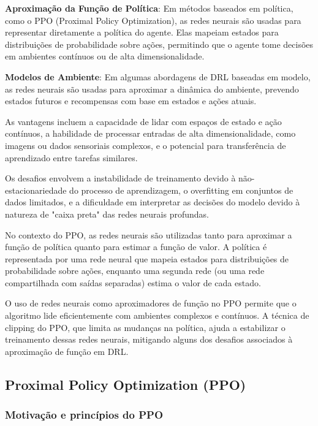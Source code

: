 \textbf{Aproximação da Função de Política}: Em métodos baseados em política, como o PPO (Proximal Policy Optimization), as redes neurais são usadas para representar diretamente a política do agente. Elas mapeiam estados para distribuições de probabilidade sobre ações, permitindo que o agente tome decisões em ambientes contínuos ou de alta dimensionalidade.

\textbf{Modelos de Ambiente}: Em algumas abordagens de DRL baseadas em modelo, as redes neurais são usadas para aproximar a dinâmica do ambiente, prevendo estados futuros e recompensas com base em estados e ações atuais.


As vantagens incluem a capacidade de lidar com espaços de estado e ação contínuos, a habilidade de processar entradas de alta dimensionalidade, como imagens ou dados sensoriais complexos, e o potencial para transferência de aprendizado entre tarefas similares. 

Os desafios envolvem a instabilidade de treinamento devido à não-estacionariedade do processo de aprendizagem, o overfitting em conjuntos de dados limitados, e a dificuldade em interpretar as decisões do modelo devido à natureza de "caixa preta" das redes neurais profundas.


No contexto do PPO, as redes neurais são utilizadas tanto para aproximar a função de política quanto para estimar a função de valor. A política é representada por uma rede neural que mapeia estados para distribuições de probabilidade sobre ações, enquanto uma segunda rede (ou uma rede compartilhada com saídas separadas) estima o valor de cada estado.

O uso de redes neurais como aproximadores de função no PPO permite que o algoritmo lide eficientemente com ambientes complexos e contínuos. A técnica de clipping do PPO, que limita as mudanças na política, ajuda a estabilizar o treinamento dessas redes neurais, mitigando alguns dos desafios associados à aproximação de função em DRL.


\subsection{Proximal Policy Optimization (PPO)}
\label{subsec:ppo}

\subsubsection{Motivação e princípios do PPO}
\label{subsubsec:ppo_principios}

